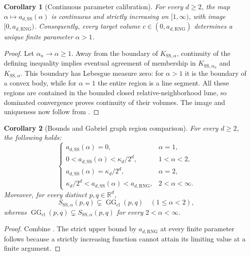 \documentclass[a4paper,fleqn]{cas-dc}
\newtheorem{corollary}{Corollary}
\theoremstyle{definition}
\theoremstyle{remark}
\newcommand{\R}{\mathds{R}}
\newcommand{\0}{\mathbf{0}}
\DeclareMathOperator{\GG}{GG}
\begin{document}
\begin{corollary}[Continuous parameter calibration]
\label{cor:continuous-calibration}
For every $d\geq2$, the map
$\alpha\mapsto a_{d,\mathrm{SS}}(\alpha)$ is continuous and strictly
increasing on $[1,\infty)$, with image
$[0,a_{d,\mathrm{RNG}})$. Consequently, every target volume
$c\in(0,a_{d,\mathrm{RNG}})$ determines a unique finite parameter
$\alpha>1$.
\end{corollary}

\begin{proof}
Let $\alpha_n\to\alpha\geq1$. Away from the boundary of
$K_{\mathrm{SS},\alpha}$, continuity of the defining inequality implies
eventual agreement of membership in $K_{\mathrm{SS},\alpha_n}$ and
$K_{\mathrm{SS},\alpha}$. This boundary has Lebesgue measure zero: for
$\alpha>1$ it is the boundary of a convex body, while for $\alpha=1$ the
entire region is a line segment. All these regions are contained in the
bounded closed relative-neighborhood lune, so dominated convergence proves
continuity of their volumes. The image and uniqueness now follow from
.
\end{proof}

\begin{corollary}[Bounds and Gabriel graph region comparison]\label{cor:bounds}
For every $d\geq2$, the following holds:
\begin{equation}
\begin{cases}
a_{d,\mathrm{SS}}(\alpha)=0, & \alpha=1,\\[1mm]
0<a_{d,\mathrm{SS}}(\alpha)<\kappa_d/2^d, & 1<\alpha<2,\\[1mm]
a_{d,\mathrm{SS}}(\alpha)=\kappa_d/2^d, & \alpha=2,\\[1mm]
\kappa_d/2^d<a_{d,\mathrm{SS}}(\alpha)<a_{d,\mathrm{RNG}},
    & 2<\alpha<\infty.
\end{cases}
\end{equation}
Moreover, for every distinct $p,q\in\R^d$,
\begin{equation}
S_{\mathrm{SS},\alpha}(p,q)\subsetneq \GG_{\mathrm{cl}}(p,q)
\quad (1\leq\alpha<2),
\end{equation}
whereas $\GG_{\mathrm{cl}}(p,q)\subsetneq S_{\mathrm{SS},\alpha}(p,q)$ for every
$2<\alpha<\infty$.
\end{corollary}

\begin{proof}
Combine . The strict
upper bound by $a_{d,\mathrm{RNG}}$ at every finite parameter follows because
a strictly increasing function cannot attain its limiting value at a finite
argument.
\end{proof}
\end{document}
